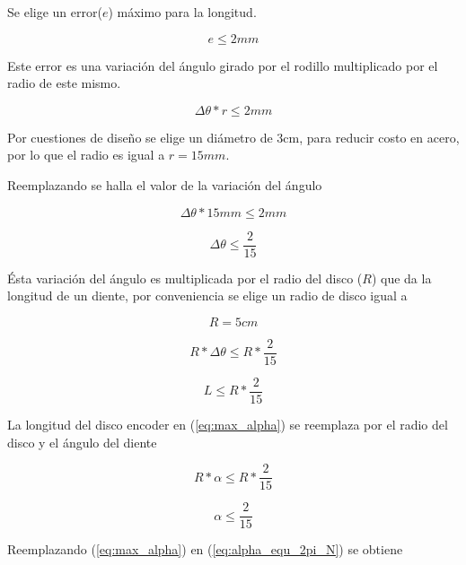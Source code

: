 \documentclass[main_conf.tex]{subfiles}
\begin{document}
Se elige un error($e$) máximo para la longitud.

\begin{equation}
e \leq 2 mm
\end{equation}

Este error es una variación del ángulo girado por el rodillo
multiplicado por el radio de este mismo.

\begin{equation}
\label{eq:delta_theta_r_leq_2mm}
\Delta  \theta *r \leq 2mm
\end{equation}

Por cuestiones de diseño se elige un diámetro de 3cm, para reducir
costo en acero, por lo que el radio es igual a $r=15mm$.

Reemplazando se halla el valor de la variación del ángulo

\begin{equation}
\Delta \theta * 15mm \leq 2mm
\end{equation}

\begin{equation}
\Delta  \theta\leq\frac{2}{15}
\end{equation}

Ésta variación del ángulo es multiplicada por el radio del disco
($R$) que da la longitud de un diente, por conveniencia se
elige un radio de disco igual a

\begin{equation}
R=5cm
\end{equation}

\begin{equation}
R*\Delta\theta\leq R*\frac{2}{15}
\end{equation}

\begin{equation}
\label{eq:max_L}
L\leq R*\frac{2}{15}
\end{equation}

La longitud del disco encoder en (\ref{eq:max_alpha}) se reemplaza
por el radio del disco y el ángulo del diente

\begin{equation}
R*\alpha\leq R*\frac{2}{15}
\end{equation}

\begin{equation}
\label{eq:max_alpha}
\alpha\leq \frac{2}{15}
\end{equation}

Reemplazando (\ref{eq:max_alpha}) en (\ref{eq:alpha_equ_2pi_N}) se
obtiene
\end{document}
